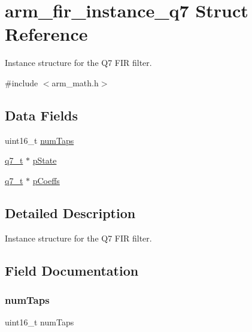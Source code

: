 \hypertarget{structarm__fir__instance__q7}{}\section{arm\+\_\+fir\+\_\+instance\+\_\+q7 Struct Reference}
\label{structarm__fir__instance__q7}


Instance structure for the Q7 F\+IR filter.  




{\ttfamily \#include $<$arm\+\_\+math.\+h$>$}

\subsection*{Data Fields}
\begin{DoxyCompactItemize}
\item 
uint16\+\_\+t \mbox{\hyperlink{structarm__fir__instance__q7_a751941891e47f522a7f5375fe8990aac}{num\+Taps}}
\item 
\mbox{\hyperlink{arm__math_8h_ae541b6f232c305361e9b416fc9eed263}{q7\+\_\+t}} $\ast$ \mbox{\hyperlink{structarm__fir__instance__q7_aa8f67102521b620af6f259afdcf29785}{p\+State}}
\item 
\mbox{\hyperlink{arm__math_8h_ae541b6f232c305361e9b416fc9eed263}{q7\+\_\+t}} $\ast$ \mbox{\hyperlink{structarm__fir__instance__q7_a54407554b4fe7bbbb43924e4eea45e7f}{p\+Coeffs}}
\end{DoxyCompactItemize}


\subsection{Detailed Description}
Instance structure for the Q7 F\+IR filter. 

\subsection{Field Documentation}
\mbox{\label{structarm__fir__instance__q7_a751941891e47f522a7f5375fe8990aac}} 
\subsubsection{\texorpdfstring{numTaps}{numTaps}}
{\footnotesize\ttfamily uint16\+\_\+t num\+Taps}


